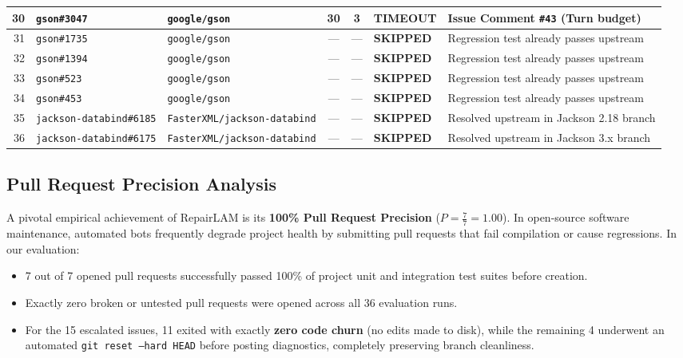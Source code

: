 \documentclass[12pt,a4paper]{report}
\begin{document}
\begin{table}[htbp]
\begin{tabularx}{\textwidth}{r l l c c l X}
30 & \texttt{gson\#3047} & \texttt{google/gson} & 30 & 3 & \textbf{TIMEOUT} & Issue Comment \texttt{\#43} (Turn budget) \\
\midrule
31 & \texttt{gson\#1735} & \texttt{google/gson} & --- & --- & \textbf{SKIPPED} & Regression test already passes upstream \\
32 & \texttt{gson\#1394} & \texttt{google/gson} & --- & --- & \textbf{SKIPPED} & Regression test already passes upstream \\
33 & \texttt{gson\#523} & \texttt{google/gson} & --- & --- & \textbf{SKIPPED} & Regression test already passes upstream \\
34 & \texttt{gson\#453} & \texttt{google/gson} & --- & --- & \textbf{SKIPPED} & Regression test already passes upstream \\
35 & \texttt{jackson-databind\#6185} & \texttt{FasterXML/jackson-databind} & --- & --- & \textbf{SKIPPED} & Resolved upstream in Jackson 2.18 branch \\
36 & \texttt{jackson-databind\#6175} & \texttt{FasterXML/jackson-databind} & --- & --- & \textbf{SKIPPED} & Resolved upstream in Jackson 3.x branch \\
\bottomrule
\end{tabularx}
\end{table}

\subsection{Pull Request Precision Analysis}
A pivotal empirical achievement of RepairLAM is its \textbf{100\% Pull Request Precision} ($P = \frac{7}{7} = 1.00$). In open-source software maintenance, automated bots frequently degrade project health by submitting pull requests that fail compilation or cause regressions. In our evaluation:
\begin{itemize}
    \item 7 out of 7 opened pull requests successfully passed 100\% of project unit and integration test suites before creation.
    \item Exactly zero broken or untested pull requests were opened across all 36 evaluation runs.
    \item For the 15 escalated issues, 11 exited with exactly \textbf{zero code churn} (no edits made to disk), while the remaining 4 underwent an automated \texttt{git reset --hard HEAD} before posting diagnostics, completely preserving branch cleanliness.
\end{itemize}
\end{document}

